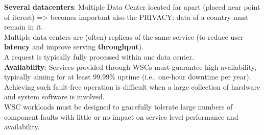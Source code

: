 \documentclass[10pt, oneside]{article}
\begin{document}
{\bf Several datacenters}:
Multiple Data Center located far apart (placed near point of iterest) => becomes important also the PRIVACY: data of a country must remain in it.\\
Multiple data centers are (often) replicas of the same service (to reduce user {\bf latency} and improve serving {\bf throughput}).\\
A request is typically fully processed within one data center.\\
{\bf Availability}:
Services provided through WSCs must guarantee high availability, typically aiming for at least 99.99\% uptime (i.e., one-hour downtime per year). Achieving such fault-free operation is difficult when a large collection of hardware and system software is involved.\\
WSC workloads must be designed to gracefully tolerate large numbers of component faults with little or no impact on service level performance and availability.
\end{document}
